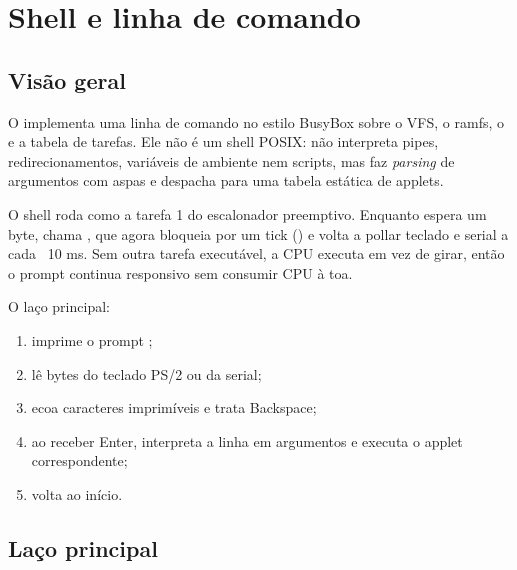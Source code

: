 \chapter{Shell e linha de comando}
\label{cap:shell}

\section{Vis\~ao geral}

O  implementa uma linha de comando no estilo BusyBox sobre
o VFS, o ramfs, o  e a tabela de tarefas. Ele n\~ao \'e um shell
POSIX: n\~ao interpreta pipes, redirecionamentos, vari\'aveis de ambiente nem
scripts, mas faz \emph{parsing} de argumentos com aspas e despacha para uma
tabela est\'atica de applets.

O shell roda como a tarefa 1 do escalonador preemptivo. Enquanto espera um
byte, chama , que agora bloqueia por um tick
() e volta a pollar teclado e serial a cada ~10 ms. Sem
outra tarefa execut\'avel, a CPU executa  em vez de girar, ent\~ao o
prompt continua responsivo sem consumir CPU \`a toa.

O la\c{c}o principal:

\begin{enumerate}
  \item imprime o prompt ;
  \item l\^e bytes do teclado PS/2 ou da serial;
  \item ecoa caracteres imprim\'iveis e trata Backspace;
  \item ao receber Enter, interpreta a linha em argumentos e executa o applet
        correspondente;
  \item volta ao in\'icio.
\end{enumerate}

\section{La\c{c}o principal}

